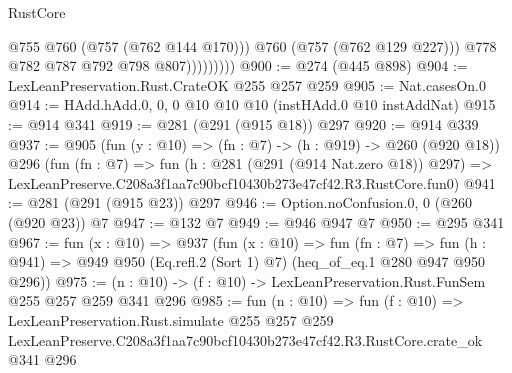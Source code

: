 \begin{lexlean}{RustCore}
\begin{coremodule}
                          @755
                          @760
                          (@757 (@762 @144 @170)))
                        @760
                        (@757 (@762 @129 @227)))
                      @778
                      @782
                      @787
                      @792
                      @798
                      @807)))))))))
@900 := @274 (@445 @898)
@904 := LexLeanPreservation.Rust.CrateOK @255 @257 @259
@905 := Nat.casesOn.{0}
@914 := HAdd.hAdd.{0, 0, 0} @10 @10 @10 (instHAdd.{0} @10 instAddNat)
@915 := @914 @341
@919 := @281 (@291 (@915 @18)) @297
@920 := @914 @339
@937 := @905
    (fun (y : @10) => (fn : @7) -> (h : @919) -> @260 (@920 @18))
    @296
    (fun (fn : @7) =>
    fun (h : @281 (@291 (@914 Nat.zero @18)) @297) =>
    LexLeanPreserve.C208a3f1aa7c90bcf10430b273e47cf42.R3.RustCore.fun0)
@941 := @281 (@291 (@915 @23)) @297
@946 := Option.noConfusion.{0, 0} (@260 (@920 @23)) @7
@947 := @132 @7
@949 := @946 @947 @7
@950 := @295 @341
@967 := fun (x : @10) =>
  @937
    (fun (x : @10) =>
    fun (fn : @7) =>
    fun (h : @941) => @949 @950 (Eq.refl.{2} (Sort 1) @7) (heq_of_eq.{1} @280 @947 @950 @296))
@975 := (n : @10) -> (f : @10) -> LexLeanPreservation.Rust.FunSem @255 @257 @259 @341 @296
@985 := fun (n : @10) =>
  fun (f : @10) =>
  LexLeanPreservation.Rust.simulate
    @255
    @257
    @259
    LexLeanPreserve.C208a3f1aa7c90bcf10430b273e47cf42.R3.RustCore.crate_ok
    @341
    @296
\end{coremodule}
\end{lexlean}
